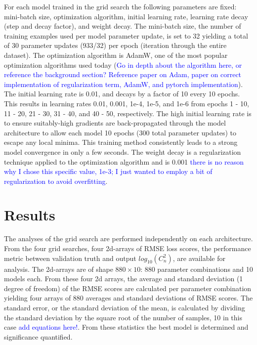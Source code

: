 For each model trained in the grid search the following parameters are fixed: mini-batch size, optimization algorithm, initial learning rate, learning rate decay (step and decay factor), and weight decay. The mini-batch size, the number of training examples used per model parameter update, is set to 32 yielding a total of 30 parameter updates (933/32) per epoch (iteration through the entire dataset). The optimization algorithm is AdamW, one of the most popular optimization algorithms used today (\textcolor{blue}{Go in depth about the algorithm here, or reference the background section? Reference paper on Adam, paper on correct implementation of regularization term, AdamW, and pytorch implementation}). The initial learning rate is 0.01, and decays by a factor of 10 every 10 epochs. This results in learning rates 0.01, 0.001, 1e-4, 1e-5, and 1e-6 from epochs 1 - 10, 11 - 20, 21 - 30, 31 - 40, and 40 - 50, respectively. The high initial learning rate is to ensure suitably-high gradients are back-propagated through the model architecture to allow each model 10 epochs (300 total parameter updates) to escape any local minima. This training method consistently leads to a strong model convergence in only a few seconds. The weight decay is a regularization technique applied to the optimization algorithm and is 0.001 \textcolor{blue}{there is no reason why I chose this specific value, 1e-3; I just wanted to employ a bit of regularization to avoid overfitting}.

\section{Results}
The analyses of the grid search are performed independently on each architecture. From the four grid searches, four 2d-arrays of RMSE loss scores, the performance metric between validation truth and output $log_{10}(C_{n}^{2})$, are available for analysis. The 2d-arrays are of shape $880 \times 10$: 880 parameter combinations and 10 models each. From these four 2d arrays, the average and standard deviation (1 degree of freedom) of the RMSE scores are calculated per parameter combination yielding four arrays of 880 averages and standard deviations of RMSE scores. The standard error, or the standard deviation of the mean, is calculated by dividing the standard deviation by the square root of the number of samples, 10 in this case \textcolor{blue}{add equations here!}. From these statistics the best model is determined and significance quantified.

